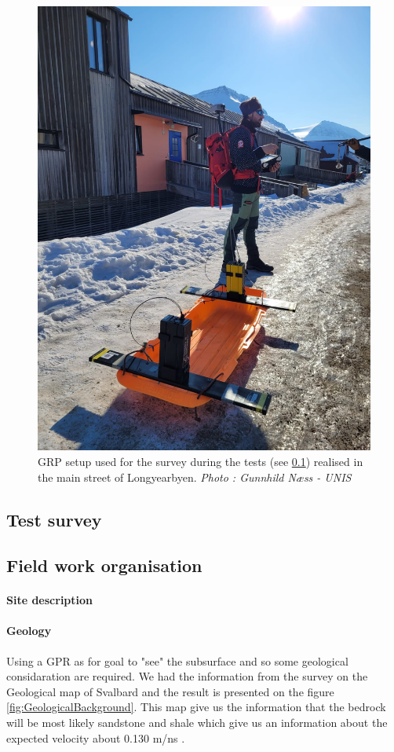 \begin{figure} [H]
    \centering
    \includegraphics[width=0.7\linewidth]{Images/00_Methodology/PictureGunnhild.jpg}
    \caption{GRP setup used for the survey during the tests (see \ref{Subsection:TestSurvey}) realised in the main street of Longyearbyen. \emph{Photo : Gunnhild Næss - UNIS}}
    \label{fig:PictureGunnhild}
\end{figure}

\subsection{Test survey} \label{Subsection:TestSurvey}

\subsection{Field work organisation}


\paragraph{Site description} \label{Paragraph:SiteDescription}

\paragraph{Geology} Using a GPR as for goal to "see" the subsurface and so some geological considaration are required. We had the information from the survey on the Geological map of Svalbard \cite{Atakan2015GeoscienceSvalbard} and the result is presented on the figure \ref{fig:GeologicalBackground}. This map give us the information that the bedrock will be most likely sandstone and shale which give us an information about the expected velocity about 0.130 m/ns \cite{GPRAnalysis}.

